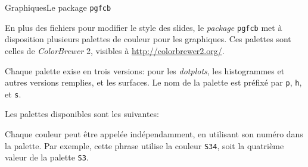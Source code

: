\documentclass{eecslides}
\begin{document}
	\begin{frame}[allowframebreaks]{Graphiques}{Le package \texttt{pgfcb}}
	    
		En plus des fichiers pour modifier le style des slides, le \emph{package} \texttt{pgfcb} met à disposition plusieurs palettes de couleur pour les graphiques. Ces palettes sont celles de \emph{ColorBrewer} 2, visibles à \url{http://colorbrewer2.org/}.

		\framebreak

		Chaque palette exise en trois versions: pour les \emph{dotplots}, les histogrammes et autres versions remplies, et les surfaces. Le nom de la palette est préfixé par \texttt{p}, \texttt{h}, et \texttt{s}.

		\framebreak

		Les palettes disponibles sont les suivantes:

		\framebreak

		Chaque \alert{couleur} peut être appelée indépendamment, en utilisant son numéro dans la palette. Par exemple, cette phrase {\color{S34} utilise la couleur \texttt{S34}}, soit la quatrième valeur de la palette \texttt{S3}. 

	\end{frame}
\end{document}
